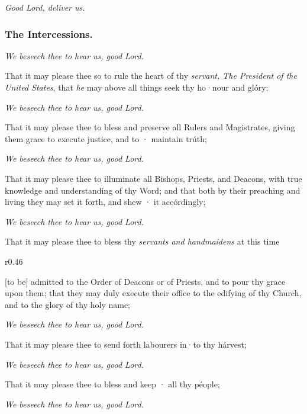 \centerline{\emph{Good Lord, deliver us.}}


\subsubsection{The Intercessions.}

\centerline{\emph{We beseech thee to hear us, good Lord.}}

That it may please thee so to rule the heart of thy \emph{servant, The President of the United States}, that \emph{he} may above all things seek thy ho·nour and glóry;

\centerline{\emph{We beseech thee to hear us, good Lord.}}

That it may please thee to bless and preserve all Rulers and Magistrates, giving them grace to execute justice, and to · maintain trúth;

\centerline{\emph{We beseech thee to hear us, good Lord.}}

That it may please thee to illuminate all Bishops, Priests, and Deacons, with true knowledge and understanding of thy Word; and that both by their preaching and living they may set it forth, and shew · it accórdingly;

\centerline{\emph{We beseech thee to hear us, good Lord.}}

\begin{leftbar}
That it may please thee to bless thy \emph{servants and handmaidens} at this time \begin{wrapfigure}{r}{0.46\textwidth}\end{wrapfigure} [to be] admitted to the Order of Deacons or of Priests, and to pour thy grace upon them; that they may duly execute their office to the edifying of thy Church, and to the glory of thy holy name; 

\centerline{\emph{We beseech thee to hear us, good Lord.}}
\end{leftbar}
That it may please thee to send forth labourers in·to thy hárvest;

\centerline{\emph{We beseech thee to hear us, good Lord.}}

That it may please thee to bless and keep · all thy péople;

\centerline{\emph{We beseech thee to hear us, good Lord.}}

